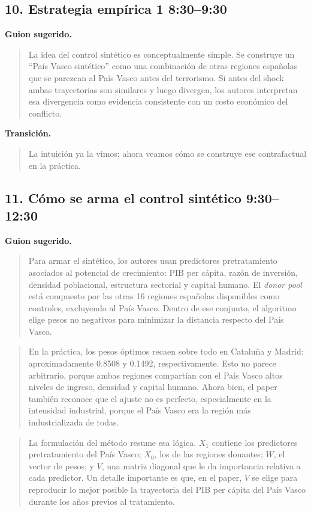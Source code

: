 \documentclass[11pt]{article}
\newcommand{\slideentry}[2]{\subsection*{#1 \hfill #2}}
\begin{document}
\slideentry{10. Estrategia empírica 1}{8:30--9:30}

\textbf{Guion sugerido.}
\begin{quote}
La idea del control sintético es conceptualmente simple. Se construye un ``País Vasco sintético'' como una combinación de otras regiones españolas que se parezcan al País Vasco antes del terrorismo. Si antes del shock ambas trayectorias son similares y luego divergen, los autores interpretan esa divergencia como evidencia consistente con un costo económico del conflicto.
\end{quote}

\textbf{Transición.}
\begin{quote}
La intuición ya la vimos; ahora veamos cómo se construye ese contrafactual en la práctica.
\end{quote}

\slideentry{11. Cómo se arma el control sintético}{9:30--12:30}

\textbf{Guion sugerido.}
\begin{quote}
Para armar el sintético, los autores usan predictores pretratamiento asociados al potencial de crecimiento: PIB per cápita, razón de inversión, densidad poblacional, estructura sectorial y capital humano. El \emph{donor pool} está compuesto por las otras 16 regiones españolas disponibles como controles, excluyendo al País Vasco. Dentro de ese conjunto, el algoritmo elige pesos no negativos para minimizar la distancia respecto del País Vasco.
\end{quote}

\begin{quote}
En la práctica, los pesos óptimos recaen sobre todo en Cataluña y Madrid: aproximadamente 0.8508 y 0.1492, respectivamente. Esto no parece arbitrario, porque ambas regiones compartían con el País Vasco altos niveles de ingreso, densidad y capital humano. Ahora bien, el paper también reconoce que el ajuste no es perfecto, especialmente en la intensidad industrial, porque el País Vasco era la región más industrializada de todas.
\end{quote}

\begin{quote}
La formulación del método resume esa lógica. \(X_1\) contiene los predictores pretratamiento del País Vasco; \(X_0\), los de las regiones donantes; \(W\), el vector de pesos; y \(V\), una matriz diagonal que le da importancia relativa a cada predictor. Un detalle importante es que, en el paper, \(V\) se elige para reproducir lo mejor posible la trayectoria del PIB per cápita del País Vasco durante los años previos al tratamiento.
\end{quote}
\end{document}
